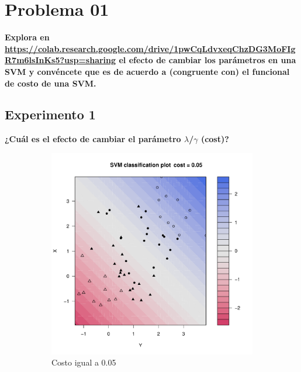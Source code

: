 \section*{Problema 01}

\textbf{Explora en
	\url{https://colab.research.google.com/drive/1pwCqLdvxeqChzDG3MoFIgR7m6lsInKs5?usp=sharing} el efecto de cambiar los parámetros en una SVM y convéncete que es de acuerdo a (congruente con) el funcional de costo de una SVM.}

\subsection*{Experimento 1}

\textbf{¿Cuál es el efecto de cambiar el parámetro $\lambda$/$\gamma$ (cost)?}

\begin{figure}[H]
	\centering
	\begin{subfigure}{0.24\linewidth}
		\includegraphics[width=1\linewidth]{Graphics/Problema_01/Experiment_01_1.pdf}
		\caption{Costo igual a 0.05}
	\end{subfigure}
	\begin{subfigure}{0.24\linewidth}

\end{subfigure}
\end{figure}
